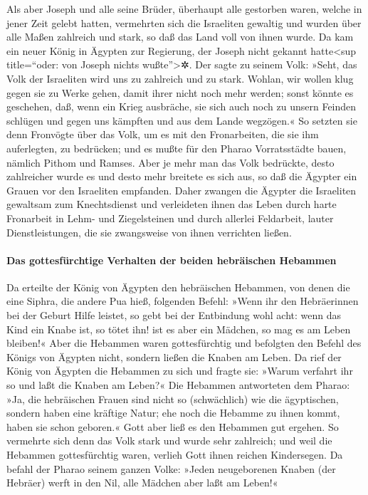  Als aber Joseph und alle seine Brüder, überhaupt alle
gestorben waren, welche in jener Zeit gelebt hatten, 
vermehrten sich die Israeliten gewaltig und wurden über alle Maßen
zahlreich und stark, so daß das Land voll von ihnen wurde.
 Da kam ein neuer König in Ägypten zur Regierung, der
Joseph nicht gekannt hatte\textless sup title=``oder: von Joseph nichts
wußte''\textgreater✲.  Der sagte zu seinem Volk: »Seht,
das Volk der Israeliten wird uns zu zahlreich und zu stark.
 Wohlan, wir wollen klug gegen sie zu Werke gehen, damit
ihrer nicht noch mehr werden; sonst könnte es geschehen, daß, wenn ein
Krieg ausbräche, sie sich auch noch zu unsern Feinden schlügen und gegen
uns kämpften und aus dem Lande wegzögen.«  So setzten sie
denn Fronvögte über das Volk, um es mit den Fronarbeiten, die sie ihm
auferlegten, zu bedrücken; und es mußte für den Pharao Vorratsstädte
bauen, nämlich Pithom und Ramses.  Aber je mehr man das
Volk bedrückte, desto zahlreicher wurde es und desto mehr breitete es
sich aus, so daß die Ägypter ein Grauen vor den Israeliten empfanden.
 Daher zwangen die Ägypter die Israeliten gewaltsam zum
Knechtsdienst  und verleideten ihnen das Leben durch
harte Fronarbeit in Lehm- und Ziegelsteinen und durch allerlei
Feldarbeit, lauter Dienstleistungen, die sie zwangsweise von ihnen
verrichten ließen.

\hypertarget{das-gottesfuxfcrchtige-verhalten-der-beiden-hebruxe4ischen-hebammen}{%
\paragraph{Das gottesfürchtige Verhalten der beiden hebräischen
Hebammen}\label{das-gottesfuxfcrchtige-verhalten-der-beiden-hebruxe4ischen-hebammen}}

 Da erteilte der König von Ägypten den hebräischen
Hebammen, von denen die eine Siphra, die andere Pua hieß, folgenden
Befehl:  »Wenn ihr den Hebräerinnen bei der Geburt Hilfe
leistet, so gebt bei der Entbindung wohl acht: wenn das Kind ein Knabe
ist, so tötet ihn! ist es aber ein Mädchen, so mag es am Leben bleiben!«
 Aber die Hebammen waren gottesfürchtig und befolgten den
Befehl des Königs von Ägypten nicht, sondern ließen die Knaben am Leben.
 Da rief der König von Ägypten die Hebammen zu sich und
fragte sie: »Warum verfahrt ihr so und laßt die Knaben am Leben?«
 Die Hebammen antworteten dem Pharao: »Ja, die
hebräischen Frauen sind nicht so (schwächlich) wie die ägyptischen,
sondern haben eine kräftige Natur; ehe noch die Hebamme zu ihnen kommt,
haben sie schon geboren.«  Gott aber ließ es den Hebammen
gut ergehen. So vermehrte sich denn das Volk stark und wurde sehr
zahlreich;  und weil die Hebammen gottesfürchtig waren,
verlieh Gott ihnen reichen Kindersegen.  Da befahl der
Pharao seinem ganzen Volke: »Jeden neugeborenen Knaben (der Hebräer)
werft in den Nil, alle Mädchen aber laßt am Leben!«

